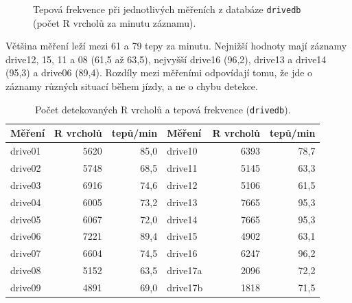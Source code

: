 \documentclass[11pt,a4paper]{article}
\begin{document}
\begin{figure}[H]
\centering
{}
\caption{Tepová frekvence při jednotlivých měřeních z databáze \texttt{drivedb}
(počet R vrcholů za minutu záznamu).}
\label{fig:bpm}
\end{figure}

Většina měření leží mezi 61 a 79 tepy za minutu. Nejnižší hodnoty mají záznamy drive12, 15, 11 a 08
(61,5 až 63,5), nejvyšší drive16 (96,2), drive13 a drive14 (95,3) a drive06 (89,4). Rozdíly mezi
měřeními odpovídají tomu, že jde o záznamy různých situací během jízdy, a ne o chybu detekce.

\begin{table}[H]
\centering\small
\caption{Počet detekovaných R vrcholů a tepová frekvence (\texttt{drivedb}).}
\label{tab:bpm}
\begin{tabular}{lrr@{\hspace{1.6cm}}lrr}
\toprule
Měření & R vrcholů & tepů/min & Měření & R vrcholů & tepů/min\\
\midrule
drive01  & 5620 & 85,0 & drive10  & 6393 & 78,7\\
drive02  & 5748 & 68,5 & drive11  & 5145 & 63,3\\
drive03  & 6916 & 74,6 & drive12  & 5106 & 61,5\\
drive04  & 6005 & 73,2 & drive13  & 7665 & 95,3\\
drive05  & 6067 & 72,0 & drive14  & 7665 & 95,3\\
drive06  & 7221 & 89,4 & drive15  & 4902 & 63,1\\
drive07  & 6604 & 74,5 & drive16  & 6247 & 96,2\\
drive08  & 5152 & 63,5 & drive17a & 2096 & 72,2\\
drive09  & 4891 & 69,0 & drive17b & 1818 & 71,5\\
\bottomrule
\end{tabular}
\end{table}
\end{document}
